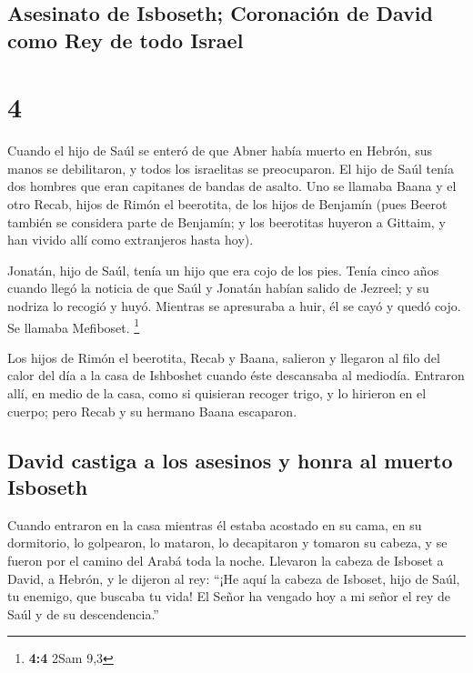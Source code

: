 \hypertarget{asesinato-de-isboseth-coronaciuxf3n-de-david-como-rey-de-todo-israel}{%
\subsection{Asesinato de Isboseth; Coronación de David como Rey de todo
Israel}\label{asesinato-de-isboseth-coronaciuxf3n-de-david-como-rey-de-todo-israel}}

\hypertarget{section-3}{%
\section{4}\label{section-3}}

 Cuando el hijo de Saúl se enteró de que Abner había
muerto en Hebrón, sus manos se debilitaron, y todos los israelitas se
preocuparon.  El hijo de Saúl tenía dos hombres que eran
capitanes de bandas de asalto. Uno se llamaba Baana y el otro Recab,
hijos de Rimón el beerotita, de los hijos de Benjamín (pues Beerot
también se considera parte de Benjamín;  y los beerotitas
huyeron a Gittaim, y han vivido allí como extranjeros hasta hoy).

 Jonatán, hijo de Saúl, tenía un hijo que era cojo de los
pies. Tenía cinco años cuando llegó la noticia de que Saúl y Jonatán
habían salido de Jezreel; y su nodriza lo recogió y huyó. Mientras se
apresuraba a huir, él se cayó y quedó cojo. Se llamaba Mefiboset.
\footnote{\textbf{4:4} 2Sam 9,3}

 Los hijos de Rimón el beerotita, Recab y Baana, salieron
y llegaron al filo del calor del día a la casa de Ishboshet cuando éste
descansaba al mediodía.  Entraron allí, en medio de la
casa, como si quisieran recoger trigo, y lo hirieron en el cuerpo; pero
Recab y su hermano Baana escaparon.

\hypertarget{david-castiga-a-los-asesinos-y-honra-al-muerto-isboseth}{%
\subsection{David castiga a los asesinos y honra al muerto
Isboseth}\label{david-castiga-a-los-asesinos-y-honra-al-muerto-isboseth}}

 Cuando entraron en la casa mientras él estaba acostado en
su cama, en su dormitorio, lo golpearon, lo mataron, lo decapitaron y
tomaron su cabeza, y se fueron por el camino del Arabá toda la noche.
 Llevaron la cabeza de Isboset a David, a Hebrón, y le
dijeron al rey: ``¡He aquí la cabeza de Isboset, hijo de Saúl, tu
enemigo, que buscaba tu vida! El Señor ha vengado hoy a mi señor el rey
de Saúl y de su descendencia.''

